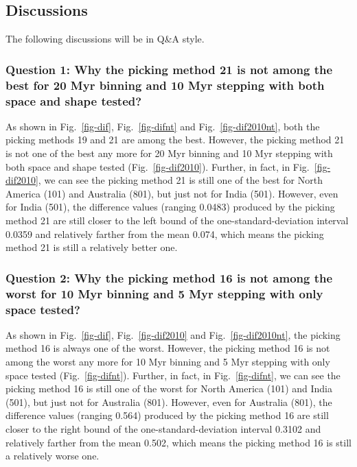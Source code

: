 \subsection{Discussions}

The following discussions will be in Q\&A style.

\subsubsection{Question 1: Why the picking method 21 is not among the best for
20 Myr binning and 10 Myr stepping with both space and shape tested?}

As shown in Fig.~\ref{fig-dif}, Fig.~\ref{fig-difnt} and
Fig.~\ref{fig-dif2010nt}, both the picking methods 19 and 21 are among the
best. However, the picking method 21 is not one of the best any more for 20 Myr
binning and 10 Myr stepping with both space and shape tested
(Fig.~\ref{fig-dif2010}). Further, in fact, in Fig.~\ref{fig-dif2010}, we can
see the picking method 21 is still one of the best for North America (101) and
Australia (801), but just not for India (501). However, even for India (501),
the difference values (ranging 0.0483) produced by the picking
method 21 are still closer to the left bound of the one-standard-deviation
interval 0.0359 and relatively farther from the mean 0.074,
which means the picking method 21 is still a relatively better one.

\subsubsection{Question 2: Why the picking method 16 is not among the worst for
10 Myr binning and 5 Myr stepping with only space tested?}

As shown in Fig.~\ref{fig-dif}, Fig.~\ref{fig-dif2010} and
Fig.~\ref{fig-dif2010nt}, the picking method 16 is always one of the worst.
However, the picking method 16 is not among the worst any more for 10 Myr
binning and 5 Myr stepping with only space tested (Fig.~\ref{fig-difnt}).
Further, in fact, in Fig.~\ref{fig-difnt}, we can see the picking method 16 is
still one of the worst for North America (101) and India (501), but just not for
Australia (801). However, even for Australia (801), the difference values
(ranging 0.564) produced by the picking method 16 are still
closer to the right bound of the one-standard-deviation interval
0.3102 and relatively farther from the mean 0.502, which means
the picking method 16 is still a relatively worse one.

